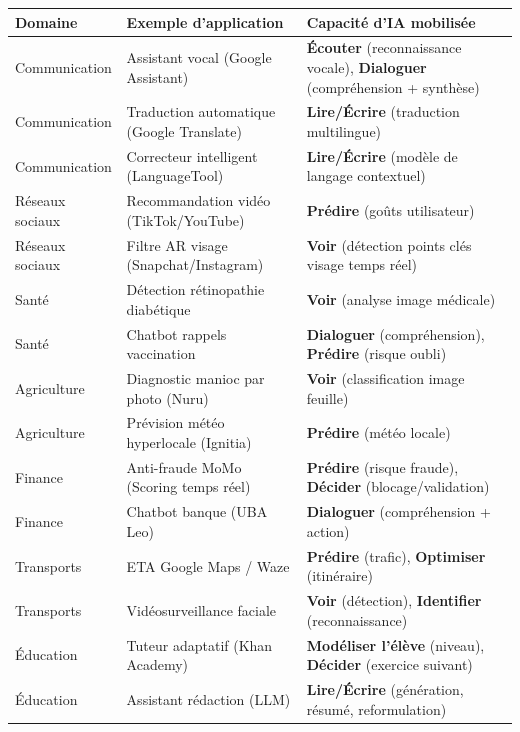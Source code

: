 \documentclass[11pt]{article}
\begin{document}
\begin{center}
\begin{tabularx}{\linewidth}{|l|X|X|}
\hline
\rowcolor{popblueL}
\textbf{Domaine} & \textbf{Exemple d'application} & \textbf{Capacité d'IA mobilisée} \\
\hline
Communication & Assistant vocal (Google Assistant) & \textbf{Écouter} (reconnaissance vocale), \textbf{Dialoguer} (compréhension + synthèse) \\
Communication & Traduction automatique (Google Translate) & \textbf{Lire/Écrire} (traduction multilingue) \\
Communication & Correcteur intelligent (LanguageTool) & \textbf{Lire/Écrire} (modèle de langage contextuel) \\
\hline
Réseaux sociaux & Recommandation vidéo (TikTok/YouTube) & \textbf{Prédire} (goûts utilisateur) \\
Réseaux sociaux & Filtre AR visage (Snapchat/Instagram) & \textbf{Voir} (détection points clés visage temps réel) \\
\hline
Santé & Détection rétinopathie diabétique & \textbf{Voir} (analyse image médicale) \\
Santé & Chatbot rappels vaccination & \textbf{Dialoguer} (compréhension), \textbf{Prédire} (risque oubli) \\
\hline
Agriculture & Diagnostic manioc par photo (Nuru) & \textbf{Voir} (classification image feuille) \\
Agriculture & Prévision météo hyperlocale (Ignitia) & \textbf{Prédire} (météo locale) \\
\hline
Finance & Anti-fraude MoMo (Scoring temps réel) & \textbf{Prédire} (risque fraude), \textbf{Décider} (blocage/validation) \\
Finance & Chatbot banque (UBA Leo) & \textbf{Dialoguer} (compréhension + action) \\
\hline
Transports & ETA Google Maps / Waze & \textbf{Prédire} (trafic), \textbf{Optimiser} (itinéraire) \\
Transports & Vidéosurveillance faciale & \textbf{Voir} (détection), \textbf{Identifier} (reconnaissance) \\
\hline
Éducation & Tuteur adaptatif (Khan Academy) & \textbf{Modéliser l'élève} (niveau), \textbf{Décider} (exercice suivant) \\
Éducation & Assistant rédaction (LLM) & \textbf{Lire/Écrire} (génération, résumé, reformulation) \\
\hline
\end{tabularx}
\end{center}
\end{document}
